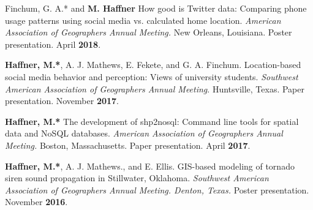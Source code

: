 \begin{cventries}
   \cventry
      {}
      {}
      {}
      {}
      {
        \begin{cvitems}
          \vspace{-2mm}
        \item {Finchum, G. A.* and \textbf{M. Haffner} How good is Twitter data:
            Comparing phone usage patterns using social media vs. calculated
            home location.
             \textit{American Association of Geographers Annual Meeting.} New Orleans, Louisiana.
            Poster presentation. April \textbf{2018}.}
          \end{cvitems}
        } %

   \cventry
      {}
      {}
      {}
      {}
      {
        \begin{cvitems}
          \vspace{-2mm}
        \item {\textbf{Haffner, M.*}, A. J. Mathews, E. Fekete, and G. A.
            Finchum. Location-based social media behavior and perception: Views
            of university students. \textit{Southwest American Association of
              Geographers Annual Meeting}. Huntsville, Texas. Paper
            presentation. November \textbf{2017}.}
          \end{cvitems}
        } %

   \cventry
      {}
      {}
      {}
      {}
      {
        \begin{cvitems}
          \vspace{-2mm}
        \item {\textbf{Haffner, M.*} The development of shp2nosql: Command line
            tools for spatial data and NoSQL databases. \textit{American
            Association of Geographers Annual Meeting.} Boston, Massachusetts.
            Paper presentation. April \textbf{2017}.}
          \end{cvitems}
        } %

   \cventry
      {}
      {}
      {}
      {}
      {
        \begin{cvitems}
          \vspace{-2mm}
        \item {\textbf{Haffner, M.*}, A. J. Mathews., and E. Ellis. GIS-based
            modeling of tornado siren sound propagation in Stillwater, Oklahoma.
            \textit{Southwest American Association of Geographers Annual
              Meeting. Denton, Texas.} Poster presentation. November
            \textbf{2016}.}
            \end{cvitems}
          } %


\end{cventries}
